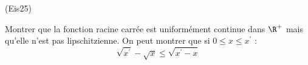 \begin{tiny}(Eis25)\end{tiny}
Montrer que la fonction racine carr{\'e}e est uniform{\'e}ment continue dans $\R^{+}$ mais qu'elle n'est pas lipschitzienne.
On peut montrer que si $0\leq x\leq x^{\prime }$ :
\[\sqrt{x^{\prime }}-\sqrt{x}\leq \sqrt{x^{\prime }-x}\]